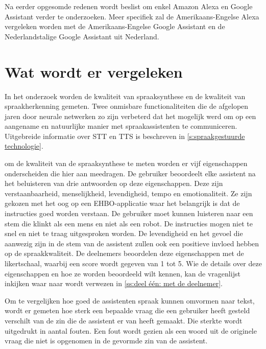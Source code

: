 Na eerder opgesomde redenen wordt beslist om enkel Amazon Alexa en Google Assistant verder te onderzoeken. Meer specifiek zal de Amerikaans-Engelse Alexa vergeleken worden met de Amerikaans-Engelse Google Assistant en de Nederlandstalige Google Assistant uit Nederland.

\section{Wat wordt er vergeleken}
\label{sec:vergelijking van stemgestuurde assistenten}
In het onderzoek worden de kwaliteit van spraaksynthese en de kwaliteit van spraakherkenning gemeten. Twee onmisbare functionaliteiten die de afgelopen jaren door neurale netwerken zo zijn verbeterd dat het mogelijk werd om op een aangename en natuurlijke manier met spraakassistenten te communiceren. Uitgebreide informatie over STT en TTS is beschreven in \ref{s:spraakgestuurde technologie}.

om de kwaliteit van de spraaksynthese te meten worden er vijf eigenschappen onderscheiden die hier aan meedragen. De gebruiker beoordeelt elke assistent na het beluisteren van drie antwoorden op deze eigenschappen. Deze zijn verstaanbaarheid, menselijkheid, levendigheid, tempo en emotionaliteit. Ze zijn gekozen met het oog op een EHBO-applicatie waar het belangrijk is dat de instructies goed worden verstaan. De gebruiker moet kunnen luisteren naar een stem die klinkt als een mens en niet als een robot. De instructies mogen niet te snel en niet te traag uitgesproken worden. De levendigheid en het gevoel die aanwezig zijn in de stem van de assistent zullen ook een positieve invloed hebben op de spraakkwaliteit. De deelnemers beoordelen deze eigenschappen met de likertschaal, waarbij een score wordt gegeven van 1 tot 5. Wie de details over deze eigenschappen en hoe ze worden beoordeeld wilt kennen, kan de vragenlijst inkijken waar naar wordt verwezen in \ref{ss:deel één: met de deelnemer}.

Om te vergelijken hoe goed de assistenten spraak kunnen omvormen naar tekst, wordt er gemeten hoe sterk een bepaalde vraag die een gebruiker heeft gesteld verschilt van de zin die de assistent er van heeft gemaakt. Die sterkte wordt uitgedrukt in aantal fouten. Een fout wordt gezien als een woord uit de originele vraag die niet is opgenomen in de gevormde zin van de assistent.

